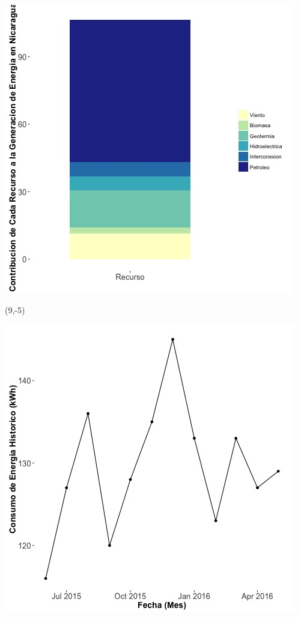 \documentclass{article}\usepackage[]{graphicx}\usepackage[]{color}
\newenvironment{knitrout}{}{} %
\begin{document}
\begin{knitrout}
\color{fgcolor}
\includegraphics[scale=0.65]{figure/gridplot2.jpg} 
\end{knitrout}

 \begin{textblock}{1}(9,-5)
\begin{minipage}{20em}
\begingroup

\endgroup
\end{minipage}
\end{textblock}

\begin{knitrout}
\color{fgcolor}
\includegraphics[scale=0.65]{figure/A14_historico_energia} 
\end{knitrout}
\end{document}
